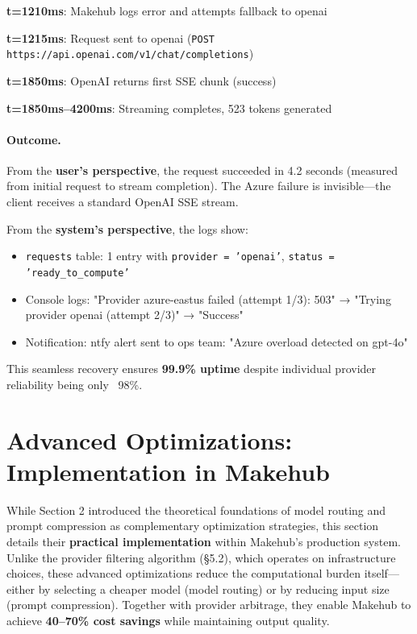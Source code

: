\documentclass[english]{article}
\begin{document}
\textbf{t=1210ms}: Makehub logs error and attempts fallback to openai

\textbf{t=1215ms}: Request sent to openai (\texttt{POST https://api.openai.com/v1/chat/completions})

\textbf{t=1850ms}: OpenAI returns first SSE chunk (success)

\textbf{t=1850ms--4200ms}: Streaming completes, 523 tokens generated

\paragraph{Outcome.}

From the \textbf{user's perspective}, the request succeeded in 4.2 seconds (measured from initial request to stream completion). The Azure failure is invisible—the client receives a standard OpenAI SSE stream.

From the \textbf{system's perspective}, the logs show:
\begin{itemize}
    \item \texttt{requests} table: 1 entry with \texttt{provider = 'openai'}, \texttt{status = 'ready\_to\_compute'}
    \item Console logs: "Provider azure-eastus failed (attempt 1/3): 503" → "Trying provider openai (attempt 2/3)" → "Success"
    \item Notification: ntfy alert sent to ops team: "Azure overload detected on gpt-4o"
\end{itemize}

This seamless recovery ensures \textbf{99.9\% uptime} despite individual provider reliability being only ~98\%.


\newpage
\section{Advanced Optimizations: Implementation in Makehub}

While Section 2 introduced the theoretical foundations of model routing and prompt compression as complementary optimization strategies, this section details their \textbf{practical implementation} within Makehub's production system. Unlike the provider filtering algorithm (§5.2), which operates on infrastructure choices, these advanced optimizations reduce the computational burden itself—either by selecting a cheaper model (model routing) or by reducing input size (prompt compression). Together with provider arbitrage, they enable Makehub to achieve \textbf{40--70\% cost savings} while maintaining output quality.
\end{document}
